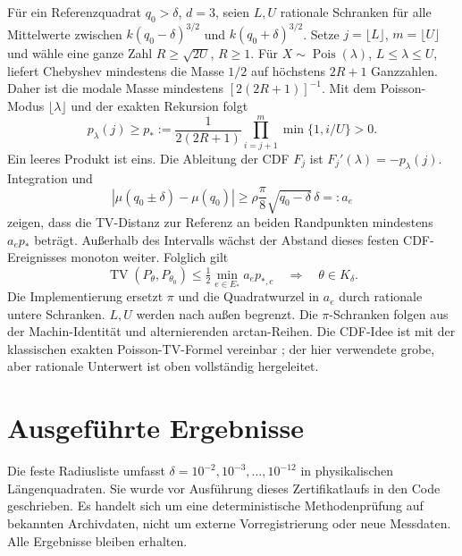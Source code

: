 \documentclass[11pt,a4paper]{article}
\newcommand{\TV}{\operatorname{TV}}\newcommand{\Pois}{\operatorname{Pois}}
\begin{document}
Für ein Referenzquadrat $q_0>\delta$, $d=3$, seien $L,U$ rationale Schranken für alle Mittelwerte zwischen $k(q_0-\delta)^{3/2}$ und $k(q_0+\delta)^{3/2}$. Setze $j=\lfloor L\rfloor$, $m=\lfloor U\rfloor$ und wähle eine ganze Zahl $R\geq\sqrt{2U}$, $R\geq1$. Für $X\sim\Pois(\lambda)$, $L\leq\lambda\leq U$, liefert Chebyshev mindestens die Masse $1/2$ auf höchstens $2R+1$ Ganzzahlen. Daher ist die modale Masse mindestens $[2(2R+1)]^{-1}$. Mit dem Poisson-Modus $\lfloor\lambda\rfloor$ und der exakten Rekursion folgt
\begin{equation}\label{eq:pmflower}
 p_\lambda(j)\geq p_*:=\frac{1}{2(2R+1)}
 \prod_{i=j+1}^{m}\min\{1,i/U\}>0.
\end{equation}
Ein leeres Produkt ist eins. Die Ableitung der CDF $F_j$ ist $F_j'(\lambda)=-p_\lambda(j)$. Integration und
\[
 |\mu(q_0\pm\delta)-\mu(q_0)|
 \geq\rho\frac{\pi}{8}\sqrt{q_0-\delta}\,\delta=:a_e
\]
zeigen, dass die TV-Distanz zur Referenz an beiden Randpunkten mindestens $a_ep_*$ beträgt. Außerhalb des Intervalls wächst der Abstand dieses festen CDF-Ereignisses monoton weiter. Folglich gilt
\begin{equation}\label{eq:tvlocal}
 \TV(P_\theta,P_{\theta_0})\leq\tfrac12\min_{e\in E_*}a_ep_{*,e}
 \quad\Longrightarrow\quad\theta\in K_\delta.
\end{equation}
Die Implementierung ersetzt $\pi$ und die Quadratwurzel in $a_e$ durch rationale untere Schranken. $L,U$ werden nach außen begrenzt. Die $\pi$-Schranken folgen aus der Machin-Identität und alternierenden arctan-Reihen. Die CDF-Idee ist mit der klassischen exakten Poisson-TV-Formel vereinbar \cite{adell}; der hier verwendete grobe, aber rationale Unterwert ist oben vollständig hergeleitet.

\section{Ausgeführte Ergebnisse}
Die feste Radiusliste umfasst $\delta=10^{-2},10^{-3},\ldots,10^{-12}$ in physikalischen Längenquadraten. Sie wurde vor Ausführung dieses Zertifikatlaufs in den Code geschrieben. Es handelt sich um eine deterministische Methodenprüfung auf bekannten Archivdaten, nicht um externe Vorregistrierung oder neue Messdaten. Alle Ergebnisse bleiben erhalten.
\end{document}
